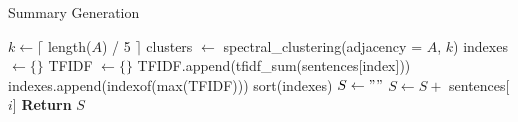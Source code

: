 \begin{algorithm} \caption{Summary Generation} \label{alg:summary}
\begin{algorithmic}[1]
    \State $k \gets \lceil$ length($A$) / 5 $\rceil$
    \State clusters $\gets$ spectral\_clustering(adjacency = $A$, $k$)
    \State indexes $\gets \{\}$
        \State TFIDF $\gets \{\}$
            \State TFIDF.append(tfidf\_sum(sentences[index]))
        \EndFor
        \State indexes.append(indexof(max(TFIDF)))
    \EndFor
    \State sort(indexes)
    \State $S \gets ""$
        \State $S \gets S +$ sentences[$i$]
    \EndFor
    \State \textbf{Return} $S$
\end{algorithmic}
\end{algorithm}

